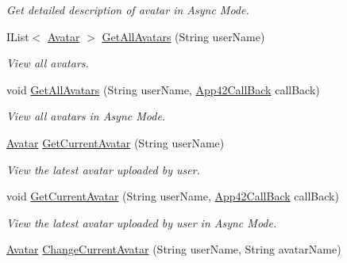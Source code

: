 \begin{DoxyCompactItemize}
\begin{DoxyCompactList}\small\item\em Get detailed description of avatar in Async Mode. \end{DoxyCompactList}\item 
I\+List$<$ \hyperlink{classcom_1_1shephertz_1_1app42_1_1paas_1_1sdk_1_1csharp_1_1avatar_1_1_avatar}{Avatar} $>$ \hyperlink{classcom_1_1shephertz_1_1app42_1_1paas_1_1sdk_1_1csharp_1_1avatar_1_1_avatar_service_a7696b99befb1a6dd0be34ca64519e19b}{Get\+All\+Avatars} (String user\+Name)
\begin{DoxyCompactList}\small\item\em View all avatars. \end{DoxyCompactList}\item 
void \hyperlink{classcom_1_1shephertz_1_1app42_1_1paas_1_1sdk_1_1csharp_1_1avatar_1_1_avatar_service_a272354ee5c3c424b1a469e2cf342237a}{Get\+All\+Avatars} (String user\+Name, \hyperlink{interfacecom_1_1shephertz_1_1app42_1_1paas_1_1sdk_1_1csharp_1_1_app42_call_back}{App42\+Call\+Back} call\+Back)
\begin{DoxyCompactList}\small\item\em View all avatars in Async Mode. \end{DoxyCompactList}\item 
\hyperlink{classcom_1_1shephertz_1_1app42_1_1paas_1_1sdk_1_1csharp_1_1avatar_1_1_avatar}{Avatar} \hyperlink{classcom_1_1shephertz_1_1app42_1_1paas_1_1sdk_1_1csharp_1_1avatar_1_1_avatar_service_a49e49e789c64d7167a2141a09d099573}{Get\+Current\+Avatar} (String user\+Name)
\begin{DoxyCompactList}\small\item\em View the latest avatar uploaded by user. \end{DoxyCompactList}\item 
void \hyperlink{classcom_1_1shephertz_1_1app42_1_1paas_1_1sdk_1_1csharp_1_1avatar_1_1_avatar_service_a6856f001c444ed300d6c927d7168856b}{Get\+Current\+Avatar} (String user\+Name, \hyperlink{interfacecom_1_1shephertz_1_1app42_1_1paas_1_1sdk_1_1csharp_1_1_app42_call_back}{App42\+Call\+Back} call\+Back)
\begin{DoxyCompactList}\small\item\em View the latest avatar uploaded by user in Async Mode. \end{DoxyCompactList}\item 
\hyperlink{classcom_1_1shephertz_1_1app42_1_1paas_1_1sdk_1_1csharp_1_1avatar_1_1_avatar}{Avatar} \hyperlink{classcom_1_1shephertz_1_1app42_1_1paas_1_1sdk_1_1csharp_1_1avatar_1_1_avatar_service_ae79a7986c8dee949daa72bde1900f4ab}{Change\+Current\+Avatar} (String user\+Name, String avatar\+Name)

\end{DoxyCompactItemize}
